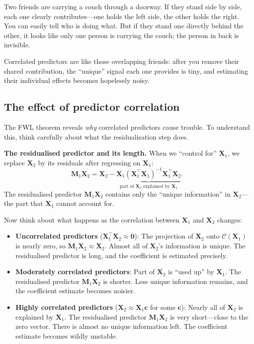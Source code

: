 \documentclass[11pt,a4paper]{article}
\theoremstyle{plain}
\theoremstyle{definition}
\newcommand{\bX}{\bm{X}}
\newcommand{\bM}{\bm{M}}
\newcommand{\Col}{\mathcal{C}}
\begin{document}
\begin{toystory}
Two friends are carrying a couch through a doorway.  If they stand side
by side, each one clearly contributes---one holds the left side, the
other holds the right.  You can easily tell who is doing what.  But if
they stand one directly behind the other, it looks like only one person
is carrying the couch; the person in back is invisible.

Correlated predictors are like those overlapping friends: after you
remove their shared contribution, the ``unique'' signal each one
provides is tiny, and estimating their individual effects becomes
hopelessly noisy.
\end{toystory}

\subsection{The effect of predictor correlation}

The FWL theorem reveals \emph{why} correlated predictors cause trouble.
To understand this, think carefully about what the residualisation step does.

\medskip
\noindent\textbf{The residualised predictor and its length.}
When we ``control for'' $\bX_1$, we replace $\bX_2$ by its residuals after regressing on $\bX_1$:
\[
  \bM_1\bX_2 = \bX_2 - \underbrace{\bX_1(\bX_1^\top\bX_1)^{-1}\bX_1^\top\bX_2}_{\text{part of }\bX_2\text{ explained by }\bX_1}.
\]
The residualised predictor $\bM_1\bX_2$ contains only the ``unique information'' in $\bX_2$---the part that $\bX_1$ cannot account for.

Now think about what happens as the correlation between $\bX_1$ and $\bX_2$ changes:
\begin{itemize}[nosep]
  \item \textbf{Uncorrelated predictors} ($\bX_1^\top\bX_2 \approx \bm{0}$):
    The projection of $\bX_2$ onto $\Col(\bX_1)$ is nearly zero, so $\bM_1\bX_2 \approx \bX_2$.
    Almost all of $\bX_2$'s information is unique. The residualised predictor is long, and the coefficient is estimated precisely.
  \item \textbf{Moderately correlated predictors}:
    Part of $\bX_2$ is ``used up'' by $\bX_1$. The residualised predictor $\bM_1\bX_2$ is shorter. Less unique information remains, and the coefficient estimate becomes noisier.
  \item \textbf{Highly correlated predictors} ($\bX_2\approx \bX_1\bm{c}$ for some $\bm{c}$):
    Nearly all of $\bX_2$ is explained by $\bX_1$. The residualised predictor $\bM_1\bX_2$ is very short---close to the zero vector. There is almost no unique information left. The coefficient estimate becomes wildly unstable.
\end{itemize}
\end{document}
